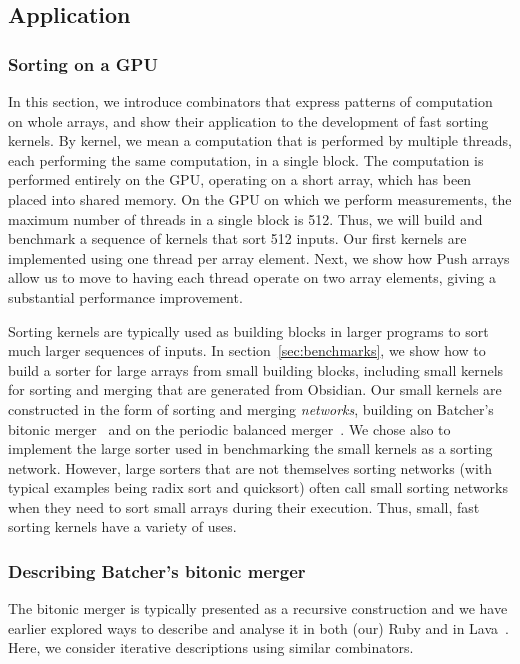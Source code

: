 \subsection{Application}
\label{sec:MARY}

\subsubsection{Sorting on a GPU}
In this section, we introduce combinators that express patterns
of computation on whole arrays, and show their application to the
development of fast sorting kernels.
By kernel, we mean a computation that is performed by multiple
threads, each performing the same computation, in a single block.
The computation is performed entirely on the GPU, operating on
a short array, which has been placed into shared memory.
On the GPU on which we perform measurements, the maximum number
of threads in a single block is 512. Thus, we will build and benchmark
a sequence of
kernels that sort 512 inputs.
Our first kernels are implemented using one thread per array element.
Next, we show how Push arrays allow us to move to having each
thread operate on two array elements, giving a substantial performance
improvement.

Sorting kernels are typically used as building blocks in larger
programs to sort much larger sequences of inputs. In section~\ref{sec:benchmarks},
we show how to build a sorter for large arrays from small building blocks, including
small kernels for sorting and merging that are generated from Obsidian.
Our small kernels are constructed in the form of sorting and merging {\em networks},
building on Batcher's bitonic merger~\cite{Batcher} and
on the periodic balanced merger~\cite{PeriodicBalanced}.
We chose also to implement the large sorter used  in benchmarking the
small kernels as a sorting network. However, large
sorters that are not themselves sorting networks (with typical examples being radix sort and quicksort) often call small sorting networks when they need to sort small arrays during their execution.
Thus, small, fast sorting kernels have a variety of uses.

\subsubsection{Describing Batcher's bitonic merger}

The bitonic merger is typically presented as a recursive
construction and we have earlier explored ways to describe
and analyse it in both (our) Ruby and in Lava~\cite{sortsRuby,LAVASORTER}.
Here, we consider iterative descriptions using similar combinators.

